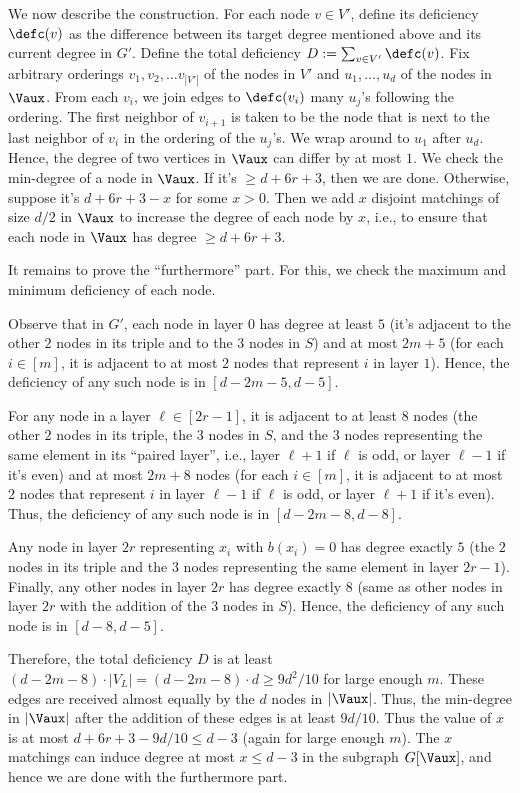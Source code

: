     We now describe the construction. For each node $v\in V'$, define its deficiency $\defc(v)$ as the difference between its target degree mentioned above and its current degree in $G'$. Define the total deficiency $D:= \sum_{v\in V'} \defc(v)$.  Fix arbitrary orderings $v_1,v_2,\ldots v_{|V'|}$ of the nodes in $V'$ and $u_1,\ldots,u_d$ of the nodes in $\Vaux$. From each $v_i$, we join edges to $\defc(v_i)$ many $u_j$'s following the ordering. The first neighbor of $v_{i+1}$ is taken to be the node that is next to the last neighbor of $v_i$ in the ordering of the $u_j$'s. We wrap around to $u_1$ after $u_d$. Hence, the degree of two vertices in $\Vaux$ can differ by at most $1$. We check the min-degree of a node in $\Vaux$. If it's $\geq d+6r+3$, then we are done. Otherwise, suppose it's $d+6r+3-x$ for some $x>0$. Then we add $x$ disjoint matchings of size $d/2$ in $\Vaux$ to increase the degree of each node by $x$, i.e., to ensure that each node in $\Vaux$ has degree $\geq d+6r+3$.  

    It remains to prove the ``furthermore'' part. For this, we check the maximum and minimum deficiency of each node.

    Observe that in $G'$, each node in layer $0$ has degree at least $5$ (it's adjacent to the other $2$ nodes in its triple and to the $3$ nodes in $S$) and at most $2m+5$ (for each $i\in [m]$, it is adjacent to at most $2$ nodes that represent $i$ in layer $1$). Hence, the deficiency of any such node is in $[d-2m-5, d-5]$. 
    
    For any node in a layer $\ell\in [2r-1]$, it is adjacent to at least $8$ nodes (the other $2$ nodes in its triple, the $3$ nodes in $S$, and the $3$ nodes representing the same element in its ``paired layer'', i.e., layer $\ell+1$ if $\ell$ is odd, or layer $\ell-1$ if it's even) and at most $2m+8$ nodes (for each $i\in [m]$, it is adjacent to at most $2$ nodes that represent $i$ in layer $\ell-1$ if $\ell$ is odd, or layer $\ell+1$ if it's even). Thus, the deficiency of any such node is in $[d-2m-8, d-8]$.

    Any node in layer $2r$ representing $x_i$ with $b(x_i)=0$ has degree exactly $5$ (the $2$ nodes in its triple and the $3$ nodes representing the same element in layer $2r-1$). Finally, any other nodes in layer $2r$ has degree exactly $8$ (same as other nodes in layer $2r$ with the addition of the $3$ nodes in $S$). Hence, the deficiency of any such node is in $[d-8, d-5]$. 

    Therefore, the total deficiency $D$ is at least $(d-2m-8)\cdot |V_L|= (d-2m-8)\cdot d \geq 9d^2/10$ for large enough $m$. These edges are received almost equally by the $d$ nodes in $|\Vaux|$. Thus, the min-degree in $|\Vaux|$ after the addition of these edges is at least $9d/10$. Thus the value of $x$ is at most $d+6r+3-9d/10\leq d-3$ (again for large enough $m$). The $x$ matchings can induce degree at most $x\leq d-3$ in the subgraph $G[\Vaux]$, and hence we are done with the furthermore part.    




